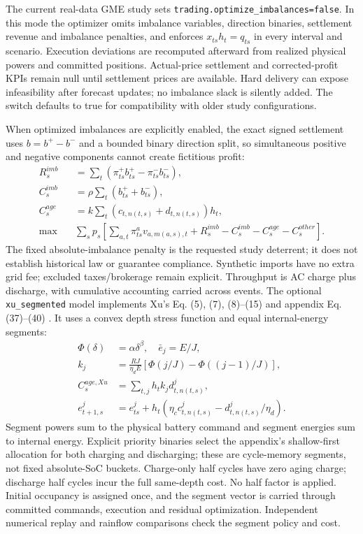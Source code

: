 \documentclass[11pt,a4paper]{article}
\begin{document}
The current real-data GME study sets
\texttt{trading.optimize\_imbalances=false}. In this mode the optimizer omits
imbalance variables, direction binaries, settlement revenue and imbalance
penalties, and enforces $x_{ts}h_t=q_{ts}$ in every interval and scenario.
Execution deviations are recomputed afterward from realized physical powers
and committed positions. Actual-price settlement and corrected-profit KPIs
remain null until settlement prices are available. Hard delivery can expose
infeasibility after forecast updates; no imbalance slack is silently added.
The switch defaults to true for compatibility with older study configurations.

When optimized imbalances are explicitly enabled, the exact signed settlement uses $b=b^+-b^-$ and a bounded binary direction split,
so simultaneous positive and negative components cannot create fictitious profit:
\begin{align}
R_s^{imb}&=\sum_t(\pi^+_{ts}b^+_{ts}-\pi^-_{ts}b^-_{ts}),\\
C_s^{imb}&=\rho\sum_t(b^+_{ts}+b^-_{ts}),\\
C_s^{age}&=k\sum_t(c_{t,n(t,s)}+d_{t,n(t,s)})h_t,\\
\max\quad&\sum_s p_s\left[\sum_{a,t}\pi^a_{ts}v_{a,m(a,s),t}
+R_s^{imb}-C_s^{imb}-C_s^{age}-C_s^{other}\right].
\end{align}
The fixed absolute-imbalance penalty is the requested study deterrent; it does
not establish historical law or guarantee compliance. Synthetic imports have no
extra grid fee; excluded taxes/brokerage remain explicit. Throughput is AC charge
plus discharge, with cumulative accounting carried across events. The optional
\texttt{xu\_segmented} model implements Xu's Eq. (5), (7), (8)--(15) and appendix
Eq. (37)--(40) \cite{xu2017aging}. It uses a convex depth stress function and equal
internal-energy segments:
\begin{align}
\Phi(\delta)&=\alpha\delta^\beta,\quad \bar e_j=E/J,\\
k_j&=\frac{RJ}{\eta_d E}\left[\Phi(j/J)-\Phi((j-1)/J)\right],\\
C_s^{age,Xu}&=\sum_{t,j}h_t k_j d^j_{t,n(t,s)},\\
e^j_{t+1,s}&=e^j_{ts}+h_t\left(\eta_c c^j_{t,n(t,s)}-d^j_{t,n(t,s)}/\eta_d\right).
\end{align}
Segment powers sum to the physical battery command and segment energies sum to
internal energy. Explicit priority binaries select the appendix's shallow-first
allocation for both charging and discharging; these are cycle-memory segments,
not fixed absolute-SoC buckets. Charge-only half cycles have zero aging charge;
discharge half cycles incur the full same-depth cost. No half factor is applied.
Initial occupancy is assigned once, and the segment vector is carried through
committed commands, execution and residual optimization. Independent numerical
replay and rainflow comparisons check the segment policy and cost.
\end{document}
